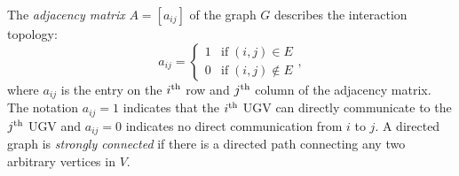 	The \textit{adjacency matrix} $A=\left[ a_{ij}\right] $ of the graph $G$ describes the interaction topology:
	\small\begin{equation*}
		a_{ij}=\begin{cases}
			1& \text{if}\;\left(i,j\right)\in E\\
			0& \text{if}\;\left(i,j\right)\notin E
		\end{cases},
	\end{equation*} \normalsize
	where $a_{ij}$ is the entry on the $i^\text{th}$ row and $j^\text{th}$ column of the adjacency matrix. 
	The notation $a_{ij}=1$ indicates that the $i^\text{th}$ UGV can directly communicate to the $j^\text{th}$ UGV and $a_{ij}=0$ indicates no direct communication from $i$ to $j$.
	 A directed graph is \textit{strongly connected} if there is a directed path connecting any two arbitrary vertices in $V$. %
	
